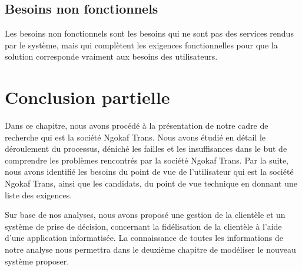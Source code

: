         \subsection{Besoins non fonctionnels}
        Les besoins non fonctionnels sont les besoins qui ne sont pas des
        services rendus par le système, mais qui complètent les
        exigences fonctionnelles pour que la solution corresponde vraiment
        aux besoins des utilisateurs.
    \section[Conclusion partielle]{Conclusion partielle}
    Dans ce chapitre, nous avons procédé à la présentation de notre
    cadre de recherche qui est la société Ngokaf Trans. Nous avons étudié
    en détail le déroulement du processus, déniché les failles et les
    insuffisances dans le but de comprendre les problèmes rencontrés par la
    société Ngokaf Trans. Par la suite, nous avons identifié les besoins du
    point de vue de l’utilisateur qui est la société Ngokaf Trans, ainsi que
    les candidats, du point de vue technique en donnant une liste des exigences.
    \par
    Sur base de nos analyses, nous avons proposé une gestion de la clientèle et
    un système de prise de décision, concernant la fidélisation de la clientèle
    à l’aide d’une application informatisée. La connaissance de toutes les
    informations de notre analyse nous permettra dans le deuxième chapitre
    de modéliser le nouveau système proposer.